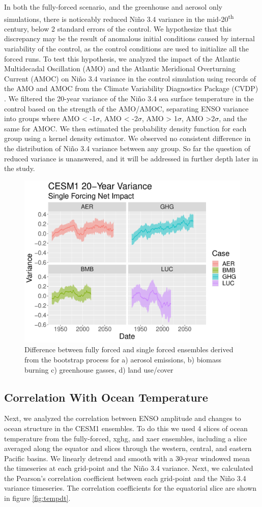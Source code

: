 \documentclass[11pt]{article}
\begin{document}
In both the fully-forced scenario, and the greenhouse and aerosol only simulations, there is noticeably reduced Niño 3.4 variance in the mid-20\textsuperscript{th} century, below 2 standard errors of the control. We hypothesize that this discrepancy may be the result of anomalous initial conditions caused by internal variability of the control, as the control conditions are used to initialize all the forced runs. To test this hypothesis, we analyzed the impact of the Atlantic Multidecadal Oscillation (AMO) and the Atlantic Meridional Overturning Current (AMOC) on Niño 3.4 variance in the control simulation using records of the AMO and AMOC from the Climate Variability Diagnostics Package (CVDP) \citep{phillips2014evaluating}. We filtered the 20-year variance of the Niño 3.4 sea surface temperature in the control based on the strength of the AMO/AMOC, separating ENSO variance into groups where AMO < -1\(\sigma\), AMO < -2\(\sigma\), AMO > 1\(\sigma\), AMO >2\(\sigma\), and the same for AMOC. We then estimated the probability density function for each group using a kernel density estimator. We observed no consistent difference in the distribution of Niño 3.4 variance between any group. So far the question of reduced variance is unanswered, and it will be addressed in further depth later in the study.

\begin{figure}
\centering
\includegraphics[width=.5\linewidth]{../../data/figures/cesm1_sf.pdf}
\caption{\label{fig:bootstrap_1}Difference between fully forced and single forced ensembles derived from the bootstrap process for a) aerosol emissions, b) biomass burning c) greenhouse gasses, d) land use/cover}
\end{figure}

\subsection{Correlation With Ocean Temperature}

Next, we analyzed the correlation between ENSO amplitude and changes to ocean structure in the CESM1 ensembles. To do this we used 4 slices of ocean temperature from the fully-forced, xghg, and xaer ensembles, including a slice averaged along the equator and slices through the western, central, and eastern Pacific basins. We linearly detrend and smooth with a 30-year windowed mean the timeseries at each grid-point and the Niño 3.4 variance. Next, we calculated the Pearson's correlation coefficient between each grid-point and the Niño 3.4 variance timeseries. The correlation coefficients for the equatorial slice are shown in figure \ref{fig:tempdt}.
\end{document}
